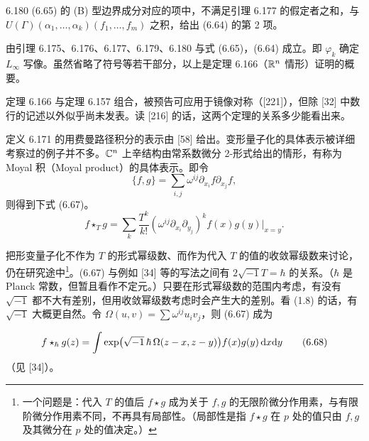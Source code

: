 \begin{lemma}{6.180}
  (6.65) 的 (B) 型边界成分对应的项中，不满足引理 6.177 的假定者之和，与 $U(\Gamma)(\alpha_1,\dots,\alpha_k)(f_1,\dots,f_m)$ 之积，给出 (6.64) 的第 2 项。
\end{lemma}

由引理 6.175、6.176、6.177、6.179、6.180 与式 (6.65)，(6.64) 成立。即 $\varphi_k$ 确定 $L_{\infty}$ 写像。虽然省略了符号等若干部分，以上是定理 6.166（$\mathbb{R}^n$ 情形）证明的概要。

定理 6.166 与定理 6.157 组合，被预告可应用于镜像对称（[221]），但除 [32] 中数行的记述以外似乎尚未发表。读 [216] 的话，这两个定理的关系多少能看出来。

定义 6.171 的用费曼路径积分的表示由 [58] 给出。变形量子化的具体表示被详细考察过的例子并不多。$\mathbb{C}^n$ 上辛结构由常系数微分 2-形式给出的情形，有称为 Moyal 积（Moyal product）的具体表示。即令
\[
  \{f,g\}=\sum_{i,j}\omega^{ij}\partial_{x_i}f\partial_{x_j}f,
\]
则得到下式 (6.67)。
\begin{equation}
  f\star_Tg=\sum_k\frac{T^k}{k!}(\omega^{ij}\partial_{x_i}\partial_{y_j})^kf(x)g(y)\Big|_{x=y}. \tag{6.67}
\end{equation}

把形变量子化不作为 $T$ 的形式幂级数、而作为代入 $T$ 的值的收敛幂级数来讨论，仍在研究途中\footnote{一个问题是：代入 $T$ 的值后 $f\star g$ 成为关于 $f,g$ 的无限阶微分作用素，与有限阶微分作用素不同，不再具有局部性。（局部性是指 $f\star g$ 在 $p$ 处的值只由 $f,g$ 及其微分在 $p$ 处的值决定。）}。(6.67) 与例如 [34] 等的写法之间有 $2\sqrt{-1}T=\hbar$ 的关系。（$\hbar$ 是 Planck 常数，但暂且看作不定元。）只要在形式幂级数的范围内考虑，有没有 $\sqrt{-1}$ 都不大有差别，但用收敛幂级数考虑时会产生大的差别。看 (1.8) 的话，有 $\sqrt{-1}$ 大概更自然。令 $\Omega(u,v)=\sum\omega^{ij}u_iv_j$，则 (6.67) 成为

\begin{equation}
  f\star_\hbar g(z)=\int\exp\bigl(\sqrt{-1}\,\hbar\,\Omega(z-x,z-y)\bigr)f(x)g(y)\,\mathrm{d} x\mathrm{d} y \tag{6.68}
\end{equation}
（见 [34]）。

